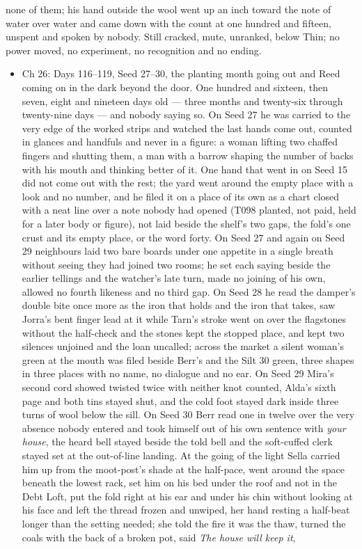 \documentclass{design/chronicle}
\begin{document}
{\begin{itemize}[leftmargin=1.4em,itemsep=1pt,topsep=3pt,parsep=0pt]
none of them; his hand outside the wool went up an inch toward the note of water over water and came down with the count at one hundred and fifteen, unspent and spoken by nobody. Still cracked, mute, unranked, below Thin; no power moved, no experiment, no recognition and no ending.

\end{itemize}

\begin{itemize}[leftmargin=1.4em,itemsep=1pt,topsep=3pt,parsep=0pt]

\item Ch 26: Days 116–119, Seed 27–30, the planting month going out and Reed coming on in the dark beyond the door. One hundred and sixteen, then seven, eight and nineteen days old — three months and twenty-six through twenty-nine days — and nobody saying so. On Seed 27 he was carried to the very edge of the worked strips and watched the last hands come out, counted in glances and handfuls and never in a figure: a woman lifting two chaffed fingers and shutting them, a man with a barrow shaping the number of backs with his mouth and thinking better of it. One hand that went in on Seed 15 did not come out with the rest; the yard went around the empty place with a look and no number, and he filed it on a place of its own as a chart closed with a neat line over a note nobody had opened (T098 planted, not paid, held for a later body or figure), not laid beside the shelf’s two gaps, the fold’s one crust and its empty place, or the word forty. On Seed 27 and again on Seed 29 neighbours laid two bare boards under one appetite in a single breath without seeing they had joined two rooms; he set each saying beside the earlier tellings and the watcher’s late turn, made no joining of his own, allowed no fourth likeness and no third gap. On Seed 28 he read the damper’s double bite once more as the iron that holds and the iron that takes, saw Jorra’s bent finger lead at it while Tarn’s stroke went on over the flagstones without the half-check and the stones kept the stopped place, and kept two silences unjoined and the loan uncalled; across the market a silent woman’s green at the mouth was filed beside Berr’s and the Silt 30 green, three shapes in three places with no name, no dialogue and no ear. On Seed 29 Mira’s second cord showed twisted twice with neither knot counted, Alda’s sixth page and both tins stayed shut, and the cold foot stayed dark inside three turns of wool below the sill. On Seed 30 Berr read one in twelve over the very absence nobody entered and took himself out of his own sentence with \emph{your house}, the heard bell stayed beside the told bell and the soft-cuffed clerk stayed set at the out-of-line landing. At the going of the light Sella carried him up from the moot-post’s shade at the half-pace, went around the space beneath the lowest rack, set him on his bed under the roof and not in the Debt Loft, put the fold right at his ear and under his chin without looking at his face and left the thread frozen and unwiped, her hand resting a half-beat longer than the setting needed; she told the fire it was the thaw, turned the coals with the back of a broken pot, said \emph{The house will keep it}, 
\end{itemize}}
\end{document}

